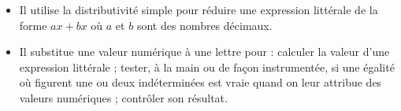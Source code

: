 \begin{prerequis}[Objectifs de 5\up{e}]  
    \begin{itemize}  
        \item Il utilise la distributivité simple pour réduire une expression littérale de la forme $ax + bx$ où $a$ et $b$ sont des nombres décimaux.
        \item Il substitue une valeur numérique à une lettre pour : calculer la valeur d’une expression littérale ; tester, à la main ou de façon instrumentée, si une égalité où figurent une ou deux indéterminées est vraie quand on leur attribue des valeurs numériques ; contrôler son résultat.
    \end{itemize}
\end{prerequis}
